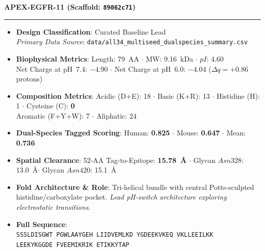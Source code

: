 \documentclass[11pt]{article}
\begin{document}
\noindent\textbf{\color{navyblue}\large APEX-EGFR-11  \quad (Scaffold: \texttt{89062c71})} \\
\vspace{-0.4em}
\rule{\textwidth}{0.6pt}
\vspace{-0.2em}
\begin{itemize}
  \setlength{\itemsep}{2pt}
  \setlength{\parskip}{0pt}
  \item \textbf{Design Classification}: Curated Baseline Lead \\
    \textit{Primary Data Source}: \texttt{\small data/all34\_multiseed\_dualspecies\_summary.csv}
  \item \textbf{Biophysical Metrics}: Length: 79~AA $\cdot$ MW: 9.16~kDa $\cdot$ $pI$: 4.60 \\
    Net Charge at pH~7.4: $-4.90$ $\cdot$ Net Charge at pH~6.0: $-4.04$ ($\Delta q = +0.86$ protons)
  \item \textbf{Composition Metrics}: Acidic (D+E): 18 $\cdot$ Basic (K+R): 13 $\cdot$ Histidine (H): 1 $\cdot$ Cysteine (C): \textbf{0} \\
    Aromatic (F+Y+W): 7 $\cdot$ Aliphatic: 24
  \item \textbf{Dual-Species Tagged Scoring}: Human: \textbf{0.825} $\cdot$ Mouse: \textbf{0.647} $\cdot$ Mean: \textbf{0.736}
  \item \textbf{Spatial Clearance}: 52-AA Tag-to-Epitope: \textbf{15.78~\AA} $\cdot$ Glycan $Asn328$: 13.0~\AA $\cdot$ Glycan $Asn420$: 15.1~\AA
  \item \textbf{Fold Architecture \& Role}: Tri-helical bundle with central Potts-sculpted histidine/carboxylate pocket. \textit{Lead pH-switch architecture exploring electrostatic transitions}.
  \item \textbf{Full Sequence}: \\
    \texttt{\small SSSLDISGWT PGWLAAYGEH LIIDVEMLKD YGDEEKVKEQ VKLLEEILKK \\
    LEEKYKGGDE FVEEMIKRIK ETIKKYTAP}
\end{itemize}
\vspace{0.8em}
\end{document}
